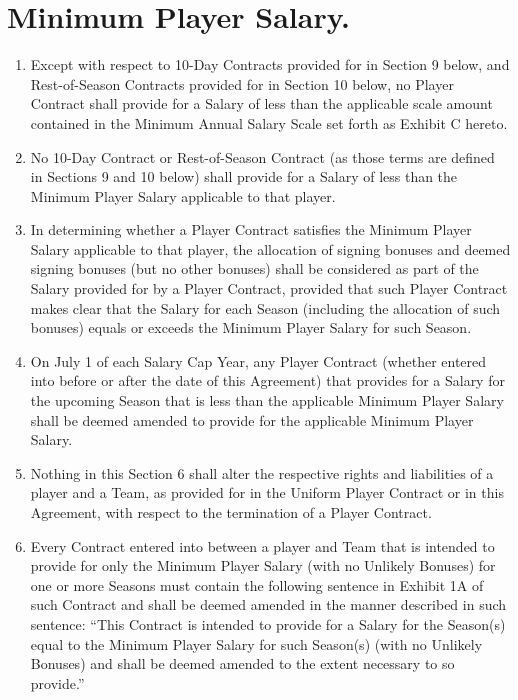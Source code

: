 \documentclass[
]{book}
\providecommand{\tightlist}{%
  \setlength{\itemsep}{0pt}\setlength{\parskip}{0pt}}
\begin{document}
\hypertarget{minimum-player-salary.}{%
\section{Minimum Player Salary.}\label{minimum-player-salary.}}

\begin{enumerate}
\def\labelenumi{(\alph{enumi})}
\tightlist
\item
  Except with respect to 10-Day Contracts provided for in Section 9 below, and Rest-of-Season Contracts provided for in Section 10 below, no Player Contract shall provide for a Salary of less than the applicable scale amount contained in the Minimum Annual Salary Scale set forth as Exhibit C hereto.
\item
  No 10-Day Contract or Rest-of-Season Contract (as those terms are defined in Sections 9 and 10 below) shall provide for a Salary of less than the Minimum Player Salary applicable to that player.
\item
  In determining whether a Player Contract satisfies the Minimum Player Salary applicable to that player, the allocation of signing bonuses and deemed signing bonuses (but no other bonuses) shall be considered as part of the Salary provided for by a Player Contract, provided that such Player Contract makes clear that the Salary for each Season (including the allocation of such bonuses) equals or exceeds the Minimum Player Salary for such Season.
\item
  On July 1 of each Salary Cap Year, any Player Contract (whether entered into before or after the date of this Agreement) that provides for a Salary for the upcoming Season that is less than the applicable Minimum Player Salary shall be deemed amended to provide for the applicable Minimum Player Salary.
\item
  Nothing in this Section 6 shall alter the respective rights and liabilities of a player and a Team, as provided for in the Uniform Player Contract or in this Agreement, with respect to the termination of a Player Contract.
\item
  Every Contract entered into between a player and Team that is intended to provide for only the Minimum Player Salary (with no Unlikely Bonuses) for one or more Seasons must contain the following sentence in Exhibit 1A of such Contract and shall be deemed amended in the manner described in such sentence: ``This Contract is intended to provide for a Salary for the Season(s) equal to the Minimum Player Salary for such Season(s) (with no Unlikely Bonuses) and shall be deemed amended to the extent necessary to so provide.''
\end{enumerate}
\end{document}

